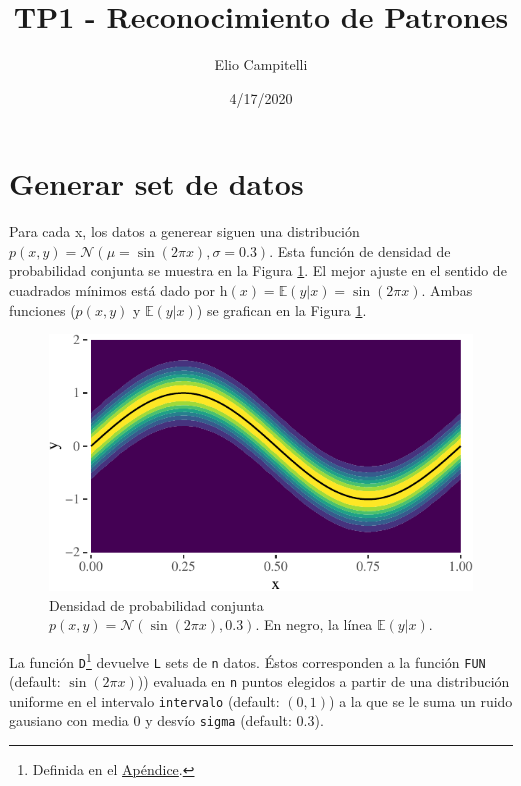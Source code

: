 \documentclass[]{tufte-handout}
\title{TP1 - Reconocimiento de Patrones}
\author{Elio Campitelli}
\date{4/17/2020}
\begin{document}
\maketitle




\hypertarget{generar-set-de-datos}{%
\section{Generar set de datos}\label{generar-set-de-datos}}

Para cada x, los datos a generear siguen una distribución \(p(x, y) = \mathcal{N}(\mu = \sin(2\pi x), \sigma = 0.3)\). Esta función de densidad de probabilidad conjunta se muestra en la Figura \ref{fig:densidad}. El mejor ajuste en el sentido de cuadrados mínimos está dado por \(\mathrm{h}(x) = \mathbb{E}(y|x) =\sin(2\pi x)\). Ambas funciones (\(p(x, y)\) y \(\mathbb{E}(y|x)\)) se grafican en la Figura \ref{fig:densidad}.

\begin{figure}
\includegraphics{README_files/figure-latex/densidad-1} \caption{Densidad de probabilidad conjunta $p(x, y) = \mathcal{N}(\sin(2\pi x), 0.3)$. En negro, la línea $\mathbb{E}(y|x)$.}\label{fig:densidad}
\end{figure}

La función \texttt{D}\footnote{Definida en el \protect\hyperlink{def-d}{Apéndice}.} devuelve \texttt{L} sets de \texttt{n} datos. Éstos corresponden a la función \texttt{FUN} (default: \(\sin(2\pi x)\))) evaluada en \texttt{n} puntos elegidos a partir de una distribución uniforme en el intervalo \texttt{intervalo} (default: \((0, 1)\)) a la que se le suma un ruido gausiano con media 0 y desvío \texttt{sigma} (default: \(0.3\)).
\end{document}
